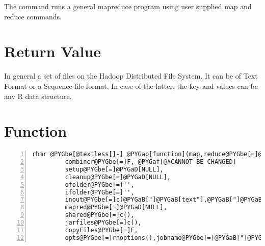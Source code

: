 \documentclass[letterpaper,10pt,english]{manual}
\begin{document}
The  command runs a general mapreduce program using user supplied map
and reduce commands.


\section{Return Value}

In general a set of files on the Hadoop Distributed File System. It can be of
Text Format or a Sequence file format. In case of the latter, the key and values
can be any R data structure.


\section{Function}

\begin{Verbatim}[commandchars=@\[\],numbers=left,firstnumber=1,stepnumber=1]
rhmr @PYGbe[@textless[]-] @PYGap[function](map,reduce@PYGbe[=]@PYGaD[NULL],
         combiner@PYGbe[=]F, @PYGaf[@#CANNOT BE CHANGED]
         setup@PYGbe[=]@PYGaD[NULL],
         cleanup@PYGbe[=]@PYGaD[NULL],
         ofolder@PYGbe[=]'',
         ifolder@PYGbe[=]'',
         inout@PYGbe[=]c(@PYGaB["]@PYGaB[text"],@PYGaB["]@PYGaB[text"]),
         mapred@PYGbe[=]@PYGaD[NULL],
         shared@PYGbe[=]c(),
         jarfiles@PYGbe[=]c(),
         copyFiles@PYGbe[=]F,
         opts@PYGbe[=]rhoptions(),jobname@PYGbe[=]@PYGaB["]@PYGaB["])
\end{Verbatim}
\end{document}
